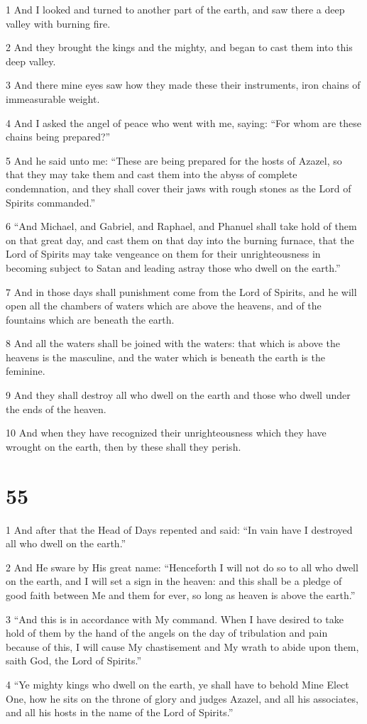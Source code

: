 \par 1 And I looked and turned to another part of the earth, and saw there a deep valley with burning fire.
\par 2 And they brought the kings and the mighty, and began to cast them into this deep valley.
\par 3 And there mine eyes saw how they made these their instruments, iron chains of immeasurable weight.
\par 4 And I asked the angel of peace who went with me, saying: “For whom are these chains being prepared?”
\par 5 And he said unto me: “These are being prepared for the hosts of Azazel, so that they may take them and cast them into the abyss of complete condemnation, and they shall cover their jaws with rough stones as the Lord of Spirits commanded.”
\par 6 “And Michael, and Gabriel, and Raphael, and Phanuel shall take hold of them on that great day, and cast them on that day into the burning furnace, that the Lord of Spirits may take vengeance on them for their unrighteousness in becoming subject to Satan and leading astray those who dwell on the earth.”
\par 7 And in those days shall punishment come from the Lord of Spirits, and he will open all the chambers of waters which are above the heavens, and of the fountains which are beneath the earth.
\par 8 And all the waters shall be joined with the waters: that which is above the heavens is the masculine, and the water which is beneath the earth is the feminine.
\par 9 And they shall destroy all who dwell on the earth and those who dwell under the ends of the heaven.
\par 10 And when they have recognized their unrighteousness which they have wrought on the earth, then by these shall they perish.

\chapter{55}

\par 1 And after that the Head of Days repented and said: “In vain have I destroyed all who dwell on the earth.”
\par 2 And He sware by His great name: “Henceforth I will not do so to all who dwell on the earth, and I will set a sign in the heaven: and this shall be a pledge of good faith between Me and them for ever, so long as heaven is above the earth.”
\par 3 “And this is in accordance with My command. When I have desired to take hold of them by the hand of the angels on the day of tribulation and pain because of this, I will cause My chastisement and My wrath to abide upon them, saith God, the Lord of Spirits.”
\par 4 “Ye mighty kings who dwell on the earth, ye shall have to behold Mine Elect One, how he sits on the throne of glory and judges Azazel, and all his associates, and all his hosts in the name of the Lord of Spirits.”

